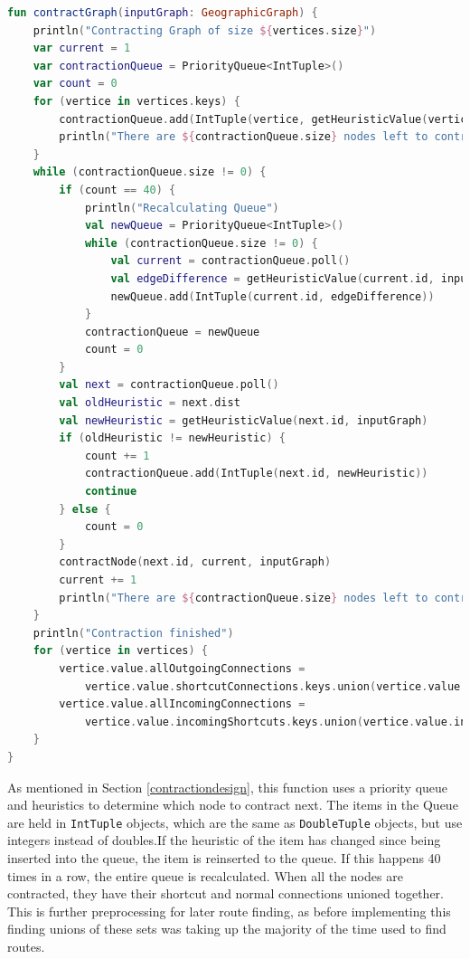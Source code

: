 \documentclass[11pt,twoside,a4paper]{report}
\begin{document}
\begin{lstlisting}[language=kotlin]
fun contractGraph(inputGraph: GeographicGraph) {
    println("Contracting Graph of size ${vertices.size}")
    var current = 1
    var contractionQueue = PriorityQueue<IntTuple>()
    var count = 0
    for (vertice in vertices.keys) {
        contractionQueue.add(IntTuple(vertice, getHeuristicValue(vertice, inputGraph)))
        println("There are ${contractionQueue.size} nodes left to contract")
    }
    while (contractionQueue.size != 0) {
        if (count == 40) {
            println("Recalculating Queue")
            val newQueue = PriorityQueue<IntTuple>()
            while (contractionQueue.size != 0) {
                val current = contractionQueue.poll()
                val edgeDifference = getHeuristicValue(current.id, inputGraph)
                newQueue.add(IntTuple(current.id, edgeDifference))
            }
            contractionQueue = newQueue
            count = 0
        }
        val next = contractionQueue.poll()
        val oldHeuristic = next.dist
        val newHeuristic = getHeuristicValue(next.id, inputGraph)
        if (oldHeuristic != newHeuristic) {
            count += 1
            contractionQueue.add(IntTuple(next.id, newHeuristic))
            continue
        } else {
            count = 0
        }
        contractNode(next.id, current, inputGraph)
        current += 1
        println("There are ${contractionQueue.size} nodes left to contract")
    }
    println("Contraction finished")
    for (vertice in vertices) {
        vertice.value.allOutgoingConnections =
            vertice.value.shortcutConnections.keys.union(vertice.value.connections.keys).toList()
        vertice.value.allIncomingConnections =
            vertice.value.incomingShortcuts.keys.union(vertice.value.incomingConnections.keys).toList()
    }
}
\end{lstlisting}
As mentioned in Section \ref{contractiondesign}, this function uses a priority queue and heuristics to determine which node to contract next. The items in the Queue are held in \texttt{IntTuple} objects, which are the same as \texttt{DoubleTuple} objects, but use integers instead of doubles.If the heuristic of the item has changed since being inserted into the queue,
the item is reinserted to the queue. If this happens 40 times in a row, the entire queue is recalculated. When all the nodes are contracted, they have their shortcut and normal connections unioned together. This is further preprocessing for later route finding, as before implementing this
finding unions of these sets was taking up the majority of the time used to find routes. \\
\end{document}
